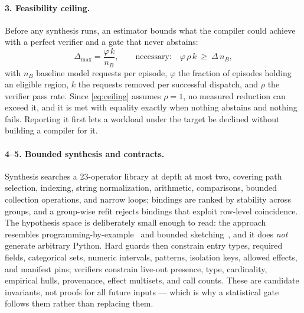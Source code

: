 \paragraph{3. Feasibility ceiling.}
Before any synthesis runs, an estimator bounds what the compiler could achieve
with a perfect verifier and a gate that never abstains:
\begin{equation}
  \Delta_{\max}=\frac{\varphi\,k}{n_B},
  \qquad\text{necessary:}\quad \varphi\,\rho\,k \ \ge\ \Delta\,n_B ,
  \label{eq:ceiling}
\end{equation}
with $n_B$ baseline model requests per episode, $\varphi$ the fraction of
episodes holding an eligible region, $k$ the requests removed per successful
dispatch, and $\rho$ the verifier pass rate. Since \cref{eq:ceiling} assumes
$\rho=1$, no measured reduction can exceed it, and it is met with equality
exactly when nothing abstains and nothing fails. Reporting it first lets a
workload under the target be declined without building a compiler for it.

\paragraph{4--5. Bounded synthesis and contracts.}
Synthesis searches a 23-operator library at depth at most two, covering path
selection, indexing, string normalization, arithmetic, comparisons, bounded
collection operations, and narrow loops; bindings are ranked by stability
across groups, and a group-wise refit rejects bindings that exploit row-level
coincidence. The hypothesis space is deliberately small enough to read: the
approach resembles programming-by-example~\citep{gulwani2011flashfill} and
bounded sketching~\citep{solarlezama2006sketching}, and it does \emph{not}
generate arbitrary Python. Hard guards then constrain entry types, required
fields, categorical sets, numeric intervals, patterns, isolation keys, allowed
effects, and manifest pins; verifiers constrain live-out presence, type,
cardinality, empirical hulls, provenance, effect multisets, and call counts.
These are candidate invariants, not proofs for all future inputs --- which is
why a statistical gate follows them rather than replacing them.

